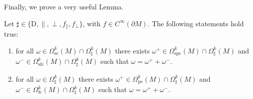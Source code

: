 Finally, we prove a very useful Lemma.
\begin{lemm}\label{Lem: on boundary conditions preserving splitting}
	Let $\sharp\in\lbrace\mathrm{D},\parallel,\perp,f_\parallel,f_\perp\rbrace$, with $f\in C^\infty(\partial M)$.
	The following statements hold true:
	\begin{enumerate}
		\item
		for all $\omega\in\Omega_{\mathrm{sc}}^k(M)\cap\Omega_\sharp^k(M)$ there exists $\omega^+\in\Omega_{\mathrm{spc}}^k(M)\cap\Omega_\sharp^k(M)$ and $\omega^-\in\Omega_{\mathrm{sfc}}^k(M)\cap\Omega_{\sharp}^k(M)$ such that $\omega=\omega^++\omega^-$.
		\item 
		for all $\omega\in\Omega_\sharp^k(M)$ there exists $\omega^+\in\Omega_{\mathrm{pc}}^k(M)\cap\Omega_\sharp^k(M)$ and $\omega^-\in\Omega_{\mathrm{fc}}^k(M)\cap\Omega_{\sharp}^k(M)$ such that $\omega=\omega^++\omega^-$.
	\end{enumerate}
\end{lemm}
